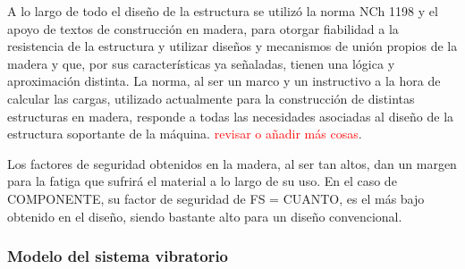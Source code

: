 A lo largo de todo el diseño de la estructura se utilizó la norma NCh 1198 y el apoyo de textos de construcción en madera, para otorgar fiabilidad a la resistencia de la estructura y utilizar diseños y mecanismos de unión propios de la madera y que, por sus características ya señaladas, tienen una lógica y aproximación distinta. La norma, al ser un marco y un instructivo a la hora de calcular las cargas, utilizado actualmente para la construcción de distintas estructuras en madera, responde a todas las necesidades asociadas al diseño de la estructura soportante de la máquina. \textcolor{red}{revisar o añadir más cosas}.

Los factores de seguridad obtenidos en la madera, al ser tan altos, dan un margen para la fatiga que sufrirá el material a lo largo de su uso. En el caso de COMPONENTE, su factor de seguridad de FS = CUANTO, es el más bajo obtenido en el diseño, siendo bastante alto para un diseño convencional.

\subsubsection{Modelo del sistema vibratorio}
